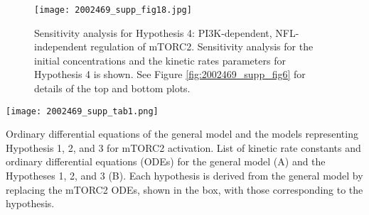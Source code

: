 \begin{figure}[tb]
	\begin{center}
		\texttt{[image: 2002469\_supp\_fig18.jpg]}
		\caption[Sensitivity analysis for Hypothesis 4: PI3K-dependent, NFL-independent regulation of mTORC2]{Sensitivity analysis for Hypothesis 4: PI3K-dependent, NFL-independent regulation of mTORC2. Sensitivity analysis for the initial concentrations and the kinetic rates parameters for Hypothesis 4 is shown. See Figure \ref{fig:2002469_supp_fig6} for details of the top and bottom plots.}
		\label{fig:2002469_supp_fig18}
	\end{center}
\end{figure}
\clearpage







\begin{table}[tb]
	\begin{center}
		\texttt{[image: 2002469\_supp\_tab1.png]}
		\caption[Ordinary differential equations of the general model and the models representing Hypothesis 1, 2, and 3 for mTORC2 activation]{Ordinary differential equations of the general model and the models representing Hypothesis 1, 2, and 3 for mTORC2 activation. List of kinetic rate constants and ordinary differential equations (ODEs) for the general model (A) and the Hypotheses 1, 2, and 3 (B). Each hypothesis is derived from the general model by replacing the mTORC2 ODEs, shown in the box, with those corresponding to the hypothesis.}
		\label{tab:2002469_supp_tab1}
	\end{center}
\end{table}
\clearpage

